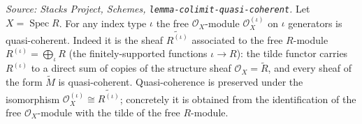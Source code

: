 \begin{lemma}
  \label{lem:free_isQuasicoherent}
  \textit{Source: Stacks Project, Schemes, \texttt{lemma-colimit-quasi-coherent}.}
  Let \(X = \operatorname{Spec} R\). For any index type \(\iota\) the free
  \(\mathcal{O}_X\)-module \(\mathcal{O}_X^{(\iota)}\) on \(\iota\) generators is
  quasi-coherent. Indeed it is the sheaf \(\widetilde{R^{(\iota)}}\) associated to the
  free \(R\)-module \(R^{(\iota)} = \bigoplus_{\iota} R\) (the finitely-supported
  functions \(\iota \to R\)): the tilde functor carries \(R^{(\iota)}\) to a direct sum
  of copies of the structure sheaf \(\mathcal{O}_X = \widetilde{R}\), and every sheaf of
  the form \(\widetilde{M}\) is quasi-coherent. Quasi-coherence is preserved under the
  isomorphism \(\mathcal{O}_X^{(\iota)} \cong \widetilde{R^{(\iota)}}\); concretely it is
  obtained from the identification of the free \(\mathcal{O}_X\)-module with the
  tilde of the free \(R\)-module.
\end{lemma}

